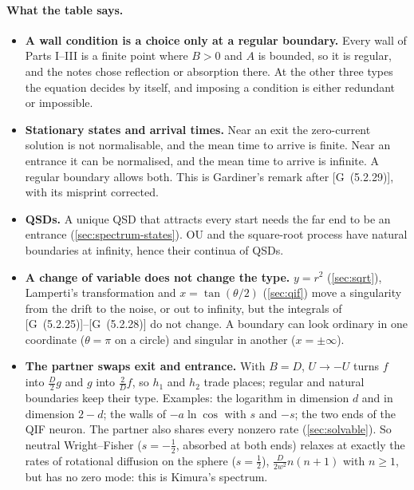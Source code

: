 \documentclass[11pt]{article}
\numberwithin{equation}{section}
\newcommand{\G}[1]{[G~(#1)]}
\begin{document}
\paragraph{What the table says.}
\begin{itemize}
  \item \textbf{A wall condition is a choice only at a regular boundary.} Every wall of Parts I--III is a finite point
        where $B>0$ and $A$ is bounded, so it is regular, and the notes chose reflection or absorption there. At the
        other three types the equation decides by itself, and imposing a condition is either redundant or impossible.
  \item \textbf{Stationary states and arrival times.} Near an exit the zero-current solution is not normalisable, and
        the mean time to arrive is finite. Near an entrance it can be normalised, and the mean time to arrive is
        infinite. A regular boundary allows both. This is Gardiner's remark after \G{5.2.29}, with its misprint
        corrected.
  \item \textbf{QSDs.} A unique QSD that attracts every start needs the far end to be an entrance
        (\cref{sec:spectrum-states}). OU and the square-root process have natural boundaries at infinity, hence their
        continua of QSDs.
  \item \textbf{A change of variable does not change the type.} $y=r^2$ (\cref{sec:sqrt}), Lamperti's transformation
        and $x=\tan(\theta/2)$ (\cref{sec:qif}) move a singularity from the drift to the noise, or out to infinity, but
        the integrals of \G{5.2.25}--\G{5.2.28} do not change. A boundary can look ordinary in one coordinate ($\theta=\pi$
        on a circle) and singular in another ($x=\pm\infty$).
  \item \textbf{The partner swaps exit and entrance.} With $B=D$, $U\to-U$ turns $f$ into $\frac D2g$ and $g$ into
        $\frac2Df$, so $h_1$ and $h_2$ trade places; regular and natural boundaries keep their type. Examples: the
        logarithm in dimension $d$ and in dimension $2-d$; the walls of $-a\ln\cos$ with $s$ and $-s$; the two ends of
        the QIF neuron. The partner also shares every nonzero rate (\cref{sec:solvable}). So neutral Wright--Fisher
        ($s=-\frac12$, absorbed at both ends) relaxes at exactly the rates of rotational diffusion on the sphere
        ($s=\frac12$), $\frac{D}{2w^2}n(n+1)$ with $n\ge1$, but has no zero mode: this is Kimura's spectrum.
\end{itemize}
\end{document}
